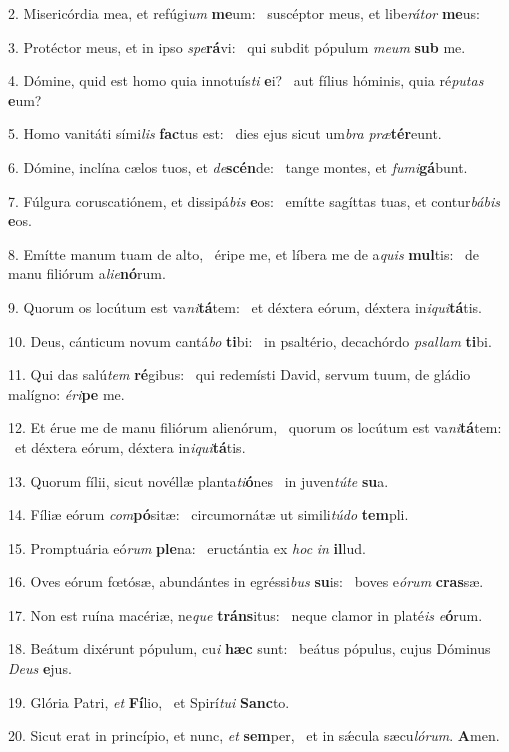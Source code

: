2. Misericórdia mea, et refúgi\textit{um} \textbf{me}um: \ast\  suscéptor meus, et libe\textit{rá}\textit{tor} \textbf{me}us:\

3. Protéctor meus, et in ipso \textit{spe}\textbf{rá}vi: \ast\  qui subdit pópulum \textit{me}\textit{um} \textbf{sub} me.\

4. Dómine, quid est homo quia innotuís\textit{ti} \textbf{e}i? \ast\  aut fílius hóminis, quia ré\textit{pu}\textit{tas} \textbf{e}um?\

5. Homo vanitáti sími\textit{lis} \textbf{fac}tus est: \ast\  dies ejus sicut um\textit{bra} \textit{præ}\textbf{tér}eunt.\

6. Dómine, inclína cælos tuos, et \textit{de}\textbf{scén}de: \ast\  tange montes, et \textit{fu}\textit{mi}\textbf{gá}bunt.\

7. Fúlgura coruscatiónem, et dissipá\textit{bis} \textbf{e}os: \ast\  emítte sagíttas tuas, et contur\textit{bá}\textit{bis} \textbf{e}os.\

8. Emítte manum tuam de alto, \dag\  éripe me, et líbera me de a\textit{quis} \textbf{mul}tis: \ast\  de manu filiórum a\textit{li}\textit{e}\textbf{nó}rum.\

9. Quorum os locútum est va\textit{ni}\textbf{tá}tem: \ast\  et déxtera eórum, déxtera in\textit{i}\textit{qui}\textbf{tá}tis.\

10. Deus, cánticum novum cantá\textit{bo} \textbf{ti}bi: \ast\  in psaltério, decachórdo \textit{psal}\textit{lam} \textbf{ti}bi.\

11. Qui das salú\textit{tem} \textbf{ré}gibus: \ast\  qui redemísti David, servum tuum, de gládio malígno: \textit{é}\textit{ri}\textbf{pe} me.\

12. Et érue me de manu filiórum alienórum, \dag\  quorum os locútum est va\textit{ni}\textbf{tá}tem: \ast\  et déxtera eórum, déxtera in\textit{i}\textit{qui}\textbf{tá}tis.\

13. Quorum fílii, sicut novéllæ planta\textit{ti}\textbf{ó}nes \ast\  in juven\textit{tú}\textit{te} \textbf{su}a.\

14. Fíliæ eórum \textit{com}\textbf{pó}sitæ: \ast\  circumornátæ ut simili\textit{tú}\textit{do} \textbf{tem}pli.\

15. Promptuária eó\textit{rum} \textbf{ple}na: \ast\  eructántia ex \textit{hoc} \textit{in} \textbf{il}lud.\

16. Oves eórum fœtósæ, abundántes in egréssi\textit{bus} \textbf{su}is: \ast\  boves e\textit{ó}\textit{rum} \textbf{cras}sæ.\

17. Non est ruína macériæ, ne\textit{que} \textbf{tráns}itus: \ast\  neque clamor in platé\textit{is} \textit{e}\textbf{ó}rum.\

18. Beátum dixérunt pópulum, cu\textit{i} \textbf{hæc} sunt: \ast\  beátus pópulus, cujus Dóminus \textit{De}\textit{us} \textbf{e}jus.\

19. Glória Patri, \textit{et} \textbf{Fí}lio, \ast\  et Spirí\textit{tu}\textit{i} \textbf{Sanc}to.\

20. Sicut erat in princípio, et nunc, \textit{et} \textbf{sem}per, \ast\  et in sǽcula sæcu\textit{ló}\textit{rum}. \textbf{A}men.\

